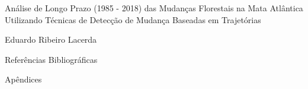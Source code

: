 \documentclass[12pt,a4paper]{article}
\begin{document}

\begin{titlepage}
    \centering
    \vspace*{\fill}

    \vspace*{0.5cm}

    \Large%
    Análise de Longo Prazo (1985 - 2018) das Mudanças Florestais na Mata Atlântica Utilizando Técnicas de Detecção de Mudança Baseadas em Trajetórias

    \vspace*{5cm}

    \large Eduardo Ribeiro Lacerda

    \vspace*{\fill}
\end{titlepage}

\newpage
\tableofcontents

\newpage
\listoffigures
\newpage


\newpage


\newpage


\newpage


\newpage


\newpage

\begin{titlepage}
    \centering
    \vspace*{\fill}

    \vspace*{0.5cm}

    \Large%
    Referências Bibliográficas

    \vspace*{5cm}


    \vspace*{\fill}
\end{titlepage}


%


\begin{titlepage}
    \centering
    \vspace*{\fill}

    \vspace*{0.5cm}

    \Large%
    Apêndices

    \vspace*{5cm}


    \vspace*{\fill}
\end{titlepage}

\newpage


\newpage

\end{document}
